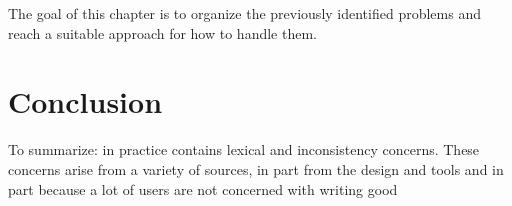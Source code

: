 The goal of this chapter is to organize the previously identified
problems and reach a suitable approach for how to handle them.


\section{Conclusion}

To summarize: in practice {\bibtex} contains lexical and inconsistency
concerns.  These concerns arise from a variety of sources, in part
from the design and tools and in part because a lot of users are not
concerned with writing good {\bibtex}
